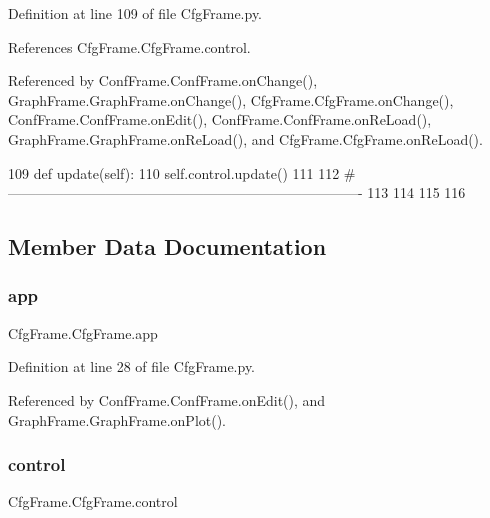 Definition at line 109 of file Cfg\+Frame.\+py.



References Cfg\+Frame.\+Cfg\+Frame.\+control.



Referenced by Conf\+Frame.\+Conf\+Frame.\+on\+Change(), Graph\+Frame.\+Graph\+Frame.\+on\+Change(), Cfg\+Frame.\+Cfg\+Frame.\+on\+Change(), Conf\+Frame.\+Conf\+Frame.\+on\+Edit(), Conf\+Frame.\+Conf\+Frame.\+on\+Re\+Load(), Graph\+Frame.\+Graph\+Frame.\+on\+Re\+Load(), and Cfg\+Frame.\+Cfg\+Frame.\+on\+Re\+Load().


\begin{DoxyCode}
109     \textcolor{keyword}{def }update(self):
110         self.control.update()
111         
112 \textcolor{comment}{#----------------------------------------------------------------------------}
113 
114 
115 
116 \end{DoxyCode}


\subsection{Member Data Documentation}
\mbox{\label{classCfgFrame_1_1CfgFrame_a16ddc4cc2acb83418a38eb3585ee0cf1}} 
\subsubsection{\texorpdfstring{app}{app}}
{\footnotesize\ttfamily Cfg\+Frame.\+Cfg\+Frame.\+app}



Definition at line 28 of file Cfg\+Frame.\+py.



Referenced by Conf\+Frame.\+Conf\+Frame.\+on\+Edit(), and Graph\+Frame.\+Graph\+Frame.\+on\+Plot().

\mbox{\label{classCfgFrame_1_1CfgFrame_a070c23f41ec4e00d48d1be8113f54eed}} 
\subsubsection{\texorpdfstring{control}{control}}
{\footnotesize\ttfamily Cfg\+Frame.\+Cfg\+Frame.\+control}




